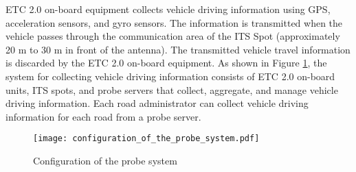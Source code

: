 \documentclass[paper]{ieice}
\begin{document}
%
\par
%
ETC 2.0 on-board equipment collects vehicle driving information using GPS, acceleration sensors, and gyro sensors.
%
The information is transmitted when the vehicle passes through the communication area of the ITS Spot (approximately 20 m to 30 m in front of the antenna).
%
The transmitted vehicle travel information is discarded by the ETC 2.0 on-board equipment.
%
As shown in Figure \ref{fig:configuration_of_the_probe_system}, the system for collecting vehicle driving information consists of ETC 2.0 on-board units, ITS spots, and probe servers that collect, aggregate, and manage vehicle driving information.
%
Each road administrator can collect vehicle driving information for each road from a probe server.
%
\begin{figure}[tb]
  \begin{center}
    \texttt{[image: configuration\_of\_the\_probe\_system.pdf]}
  \end{center}
  \caption{Configuration of the probe system}
  \label{fig:configuration_of_the_probe_system}
\end{figure}
%
\end{document}
